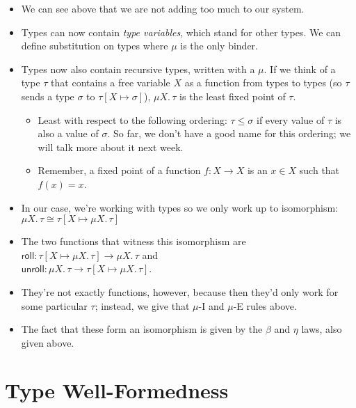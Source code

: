 \documentclass{lecturenotes}
\newcommand{\rectype}[2]{\ensuremath{\mu #1.\,#2}}
\begin{document}
\begin{itemize}
\item We can see above that we are not adding too much to our system.
\item Types can now contain \emph{type variables}, which stand for other types.
  We can define substitution on types where $\mu$ is the only binder.
\item Types now also contain recursive types, written with a $\mu$.
  If we think of a type $\tau$ that contains a free variable $X$ as a function from types to types (so $\tau$ sends a type $\sigma$ to $\tau[X \mapsto \sigma]$), $\rectype{X}{\tau}$ is the least fixed point of $\tau$.
  \begin{itemize}
  \item Least with respect to the following ordering: $\tau \leq \sigma$ if every value of $\tau$ is also a value of $\sigma$.
    So far, we don't have a good name for this ordering; we will talk more about it next week.
  \item Remember, a fixed point of a function $f : X \to X$ is an $x \in X$ such that $f(x) = x$.
  \end{itemize}
\item In our case, we're working with types so we only work up to isomorphism: $\rectype{X}{\tau} \cong \tau[X \mapsto \rectype{X}{\tau}]$
\item The two functions that witness this isomorphism are $\textsf{roll} : \tau[X \mapsto \rectype{X}{\tau}] \to \rectype{X}{\tau}$ and\\ \mbox{$\textsf{unroll} : \rectype{X}{\tau} \to \tau[X \mapsto \rectype{X}{\tau}]$}.
\item They're not exactly functions, however, because then they'd only work for some particular $\tau$; instead, we give that \textsc{$\mu$-I} and \textsc{$\mu$-E} rules above.
\item The fact that these form an isomorphism is given by the $\beta$ and $\eta$ laws, also given above.
\end{itemize}

\section{Type Well-Formedness}
\label{sec:type-well-formedness}
\end{document}
